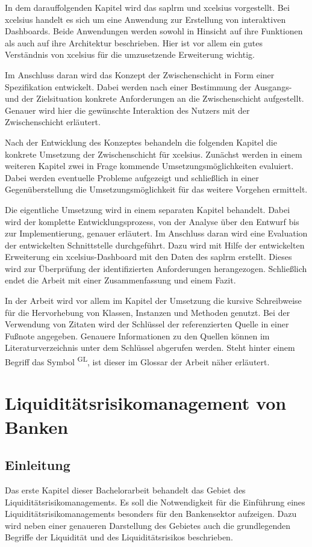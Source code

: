 \begin{onehalfspacing}
In dem darauffolgenden Kapitel wird das \gls{saplrm} und \gls{xcelsius} vorgestellt. Bei \gls{xcelsius} handelt es sich um eine Anwendung zur Erstellung von interaktiven Dashboards. Beide Anwendungen werden sowohl in Hinsicht auf ihre Funktionen als auch auf ihre Architektur beschrieben. Hier ist vor allem ein gutes Verständnis von \gls{xcelsius} für die umzusetzende Erweiterung wichtig.

Im Anschluss daran wird das Konzept der Zwischenschicht in Form einer Spezifikation entwickelt. Dabei werden nach einer Bestimmung der Ausgangs- und der Zielsituation konkrete Anforderungen an die Zwischenschicht aufgestellt. Genauer wird hier die gewünschte Interaktion des Nutzers mit der Zwischenschicht erläutert.

Nach der Entwicklung des Konzeptes behandeln die folgenden Kapitel die konkrete Umsetzung der Zwischenschicht für \gls{xcelsius}. Zunächst werden in einem weiteren Kapitel zwei in Frage kommende Umsetzungsmöglichkeiten evaluiert. Dabei werden eventuelle Probleme aufgezeigt und schließlich in einer Gegenüberstellung die Umsetzungsmöglichkeit für das weitere Vorgehen ermittelt.

Die eigentliche Umsetzung wird in einem separaten Kapitel behandelt. Dabei wird der komplette Entwicklungsprozess, von der Analyse über den Entwurf bis zur Implementierung, genauer erläutert. Im Anschluss daran wird eine Evaluation der entwickelten Schnittstelle durchgeführt. Dazu wird mit Hilfe der entwickelten Erweiterung ein \gls{xcelsius}-Dashboard mit den Daten des \gls{saplrm} erstellt. Dieses wird zur Überprüfung der identifizierten Anforderungen herangezogen. Schließlich endet die Arbeit mit einer Zusammenfassung und einem Fazit.

In der Arbeit wird vor allem im Kapitel der Umsetzung die kursive Schreibweise für die Hervorhebung von Klassen, Instanzen und Methoden genutzt. Bei der Verwendung von Zitaten wird der Schlüssel der referenzierten Quelle in einer Fußnote angegeben. Genauere Informationen zu den Quellen können im Literaturverzeichnis unter dem Schlüssel abgerufen werden. Steht hinter einem Begriff das Symbol \textsuperscript{GL}, ist dieser im Glossar der Arbeit näher erläutert.

\chapter{Liquiditätsrisikomanagement von Banken}

\section{Einleitung}
Das erste Kapitel dieser Bachelorarbeit behandelt das Gebiet des Liquiditätsrisikomanagements. Es soll die Notwendigkeit für die Einführung eines Liquiditätsrisikomanagements besonders für den Bankensektor aufzeigen. Dazu wird neben einer genaueren Darstellung des Gebietes auch die grundlegenden Begriffe der Liquidität und des Liquiditätsrisikos beschrieben.


\end{onehalfspacing}
